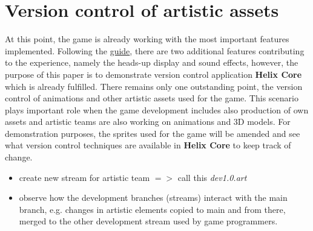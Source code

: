\section{Version control of artistic assets}
At this point, the game is already working with the most important features implemented. Following the 
\href{https://docs.godotengine.org/en/stable/getting_started/first_2d_game/06.heads_up_display.html}{\color{blue}guide},
there are two additional features contributing to the experience, namely the heads-up display and sound effects, however,
the purpose of this paper is to demonstrate version control application \textbf{Helix Core}\textsuperscript{\texttrademark}
which is already fulfilled. There remains only one outstanding point, the version control of animations and other artistic
assets used for the game. This scenario plays important role when the game development includes also production of own
assets and artistic teams are also working on animations and 3D models. \hfill \break
For demonstration purposes, the sprites used for the game will be amended and see what version control techniques are 
available in \textbf{Helix Core}\textsuperscript{\texttrademark} to keep track of change.
\begin{itemize}
    \item create new stream for artistic team {$=>$} call this \textit{dev1.0.art}
    \item observe how the development branches (streams) interact with the main branch, e.g. changes in artistic elements
    copied to main and from there, merged to the other development stream used by game programmers.
\end{itemize}